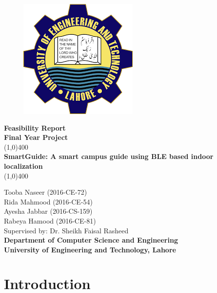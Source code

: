 \documentclass{article}
\begin{document}
\begin{titlepage}
\begin{center}
\vspace*{1cm}
\begin{figure}[h!]
\centering
\includegraphics[scale=0.5]{logo}
\end{figure}
\Large\textbf{Feasibility Report}\\
\Large\textbf{Final Year Project}\\
\vfill
\line(1,0){400}\\[1mm]
\huge{\textbf{SmartGuide: A smart campus guide using BLE based indoor localization}}\\[3mm]
\line(1,0){400}\\
\vfill

\large{Tooba Naseer  (2016-CE-72)}\\
\large{Rida Mahmood  (2016-CE-54)}\\
\large{Ayesha Jabbar  (2016-CS-159)}\\
\large{Rabeya Hamood  (2016-CE-81)}\\
\large{Supervised by: Dr. Sheikh Faisal Rasheed}\\
\large{\textbf{Department of Computer Science and Engineering}}\\
\large{\textbf{University of Engineering and Technology, Lahore}}\\
\end{center}
\end{titlepage}
\tableofcontents
\thispagestyle{empty}
\clearpage
\setcounter{page}{1}

\makeatletter
\newcommand{\heading}[1]%
{\par\vskip 1.5ex \@plus .2ex
 \hangindent=1em
 \noindent\makebox[1em][l]{$\,\bullet$}\textbf{\large #1}%
\par\vskip 1.5ex \@plus .2ex
\@afterheading}
\makeatother

\section{Introduction}
\end{document}
